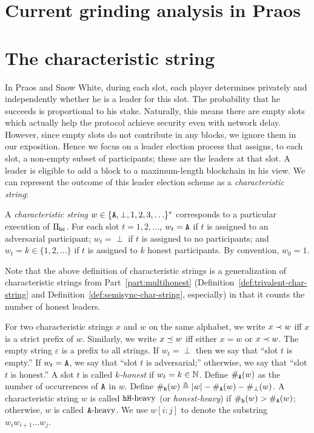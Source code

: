 \section{Current grinding analysis in Praos}


\section{The characteristic string}
In Praos and Snow White, 
during each slot, 
each player determines privately and independently 
whether he is a leader for this slot. 
The probability that he succeeds is proportional to his stake. 
Naturally, this means there are empty slots 
which actually help the protocol achieve 
security even with network delay. 
However, since empty slots do not contribute in any blocks, 
we ignore them in our exposition. 
Hence we focus on a leader election process that assigns, 
to each slot, 
a non-empty subset of participants; 
these are the leaders at that slot. 
A leader is eligible to add a block to a 
maximum-length blockchain in his view. 
We can represent the outcome of this leader election scheme 
as a \emph{characteristic string}:


\begin{definition}\label{def:char-string-praos}
  A \emph{characteristic string} $w \in \{\mathtt{A}, 
  \perp, 
  1, 2, 3, \ldots \}^*$ 
  corresponds to a particular execution of $\Pi_\mathsf{bc}$.
  For each slot $t = 1, 2, \ldots$, 
  $w_t = \mathtt{A}$ if $t$ is assigned to an adversarial participant; 
  $w_t = \perp$ if $t$ is assigned to no participants; 
  and 
  $w_t = k \in \{1,2,\ldots\}$ if $t$ is assigned to $k$ honest participants.
  By convention, $w_0 = 1$.
\end{definition}

Note that the above definition of characteristic strings 
is a generalization of characteristic strings 
from Part~\ref{part:multihonest} 
(Definition~\ref{def:trivalent-char-string} 
and Definition~\ref{def:semisync-char-string}, especially)
in that it counts the number of honest leaders. 


For two characteristic strings $x$ and $w$ on the same alphabet, 
we write $x \prec w$ iff $x$ is a strict prefix of $w$. 
Similarly, 
we write $x \preceq w$ iff either $x = w$ or $x \prec w$. 
The empty string $\varepsilon$ is a prefix to all strings. 
If $w_t = \perp$ then we say that ``slot $t$ is empty.'' 
If $w_t = \mathtt{A}$, we say that ``slot $t$ is adversarial;'' 
otherwise, we say that ``slot $t$ is honest.'' 
A slot $t$ is called \emph{$k$-honest} if $w_t = k \in \mathbb{N}$.
Define $\#_{\mathtt{A}}(w)$ as the number of occurrences of $\mathtt{A}$ in $w$. 
Define $\#_{\mathtt{h}}(w) \triangleq |w| - \#_{\mathtt{A}}(w) 
- \#_\perp(w)
$.
A characteristic string $w$ is called $\mathtt{h}\mathtt{H}\text{-heavy}$ (or \emph{honest-heavy}) if 
$\#_{\mathtt{h}}(w) > \#_{\mathtt{A}}(w)$; 
otherwise, $w$ is called $\mathtt{A}\text{-heavy}$. 
We use $w[i : j]$ to denote the substring $w_i w_{i+1}\ldots w_j$.

